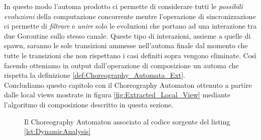 In questo modo l'automa prodotto ci permette di considerare tutti le \emph{possibili evoluzioni} della computazione concorrente mentre l'operazione di sincronizzazione ci permette di \emph{filtrare} e \emph{unire} solo le evoluzioni che portano ad una interazione tra due Goroutine sullo stesso canale. Queste tipo di interazioni, assieme a quelle di spawn, saranno le sole transizioni ammesse nell'automa finale dal momento che tutte le transizioni che non rispettano i casi definiti sopra vengono eliminate. Così facendo otteniamo in output dall'operazione di composizione un automa che rispetta la definizione \ref{def:Choreography_Automata_Ext}.\bigskip \\
Concludiamo questo capitolo con il Choreography Automaton ottenuto a partire dalle local views mostrate in figura \ref{fig:Extracted_Local_View} mediante l'algoritmo di composizione descritto in questa sezione.
\begin{figure}[h!]
    \centering
    \caption{Il Choreography Automaton associato al codice sorgente del listing \ref{lst:DynamicAnalysis}}
\end{figure}